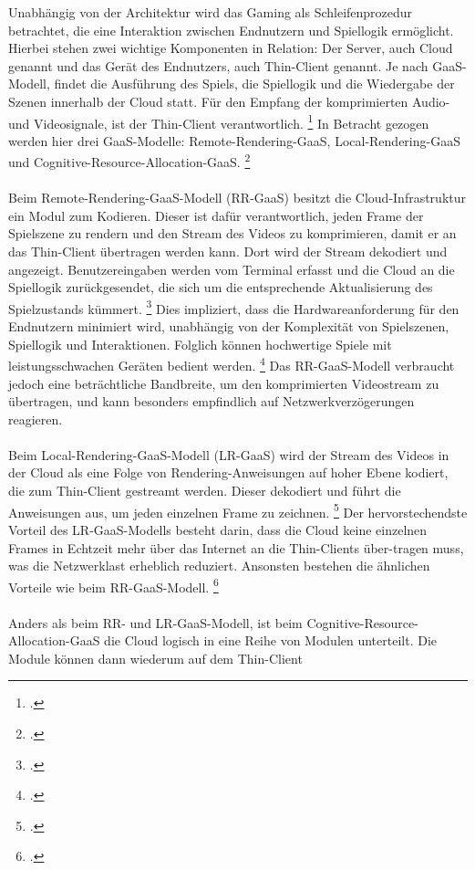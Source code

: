 \documentclass[12pt,toc=bib,toc=listof]{scrreprt}
\begin{document}
Unabhängig von der Architektur wird das Gaming als Schleifenprozedur betrachtet, die eine Interaktion zwischen Endnutzern und Spiellogik ermöglicht. 
Hierbei stehen zwei wichtige Komponenten in Relation: Der Server, auch Cloud genannt und das Gerät des Endnutzers, auch Thin-Client genannt. Je nach GaaS-Modell, 
findet die Ausführung des Spiels, die Spiellogik und die Wiedergabe der Szenen innerhalb der Cloud statt. Für den Empfang der komprimierten Audio- und Videosignale, 
ist der Thin-Client verantwortlich. \footcite [Vgl.] [] {Zadtootaghaj.2022} In Betracht gezogen werden hier drei GaaS-Modelle: Remote-Rendering-GaaS, Local-Rendering-GaaS 
und Cognitive-Resource-Allocation-GaaS. \footcite [Vgl.] [] {Cai.2014}
\\ \\
Beim Remote-Rendering-GaaS-Modell (RR-GaaS) besitzt die Cloud-Infrastruktur ein Modul zum Kodieren. Dieser ist dafür verantwortlich, jeden Frame der Spielszene zu 
rendern und den Stream des Videos zu komprimieren, damit er an das Thin-Client übertragen werden kann. Dort wird der Stream dekodiert und angezeigt. Benutzereingaben 
werden vom Terminal erfasst und die Cloud an die Spiellogik zurückgesendet, die sich um die entsprechende Aktualisierung des Spielzustands kümmert. \footcite [Vgl.] [] {Dangelo.2015}
Dies impliziert, dass die Hardwareanforderung für den Endnutzern minimiert wird, unabhängig von der Komplexität von Spielszenen, Spiellogik und Interaktionen. Folglich können hochwertige 
Spiele mit leistungsschwachen Geräten bedient werden. \footcite [Vgl.] [] {Cai.2014} Das RR-GaaS-Modell verbraucht jedoch eine beträchtliche Bandbreite, um den komprimierten Videostream 
zu übertragen, und kann besonders empfindlich auf Netzwerkverzögerungen reagieren.
\\ \\
Beim Local-Rendering-GaaS-Modell (LR-GaaS) wird der Stream des Videos in der Cloud als eine Folge von Rendering-Anweisungen auf hoher Ebene kodiert, die zum Thin-Client gestreamt werden. 
Dieser dekodiert und führt die Anweisungen aus, um jeden einzelnen Frame zu zeichnen. \footcite [Vgl.] [] {Dangelo.2015} Der hervorstechendste Vorteil des LR-GaaS-Modells besteht darin, dass 
die Cloud keine einzelnen Frames in Echtzeit mehr über das Internet an die Thin-Clients über-tragen muss, was die Netzwerklast erheblich reduziert. Ansonsten bestehen die ähnlichen Vorteile 
wie beim RR-GaaS-Modell. \footcite [Vgl.] [] {Cai.2014}
\\ \\
Anders als beim RR- und LR-GaaS-Modell, ist beim Cognitive-Resource-Allocation-GaaS die Cloud logisch in eine Reihe von Modulen unterteilt. Die Module können dann wiederum auf dem Thin-Client 
\end{document}
